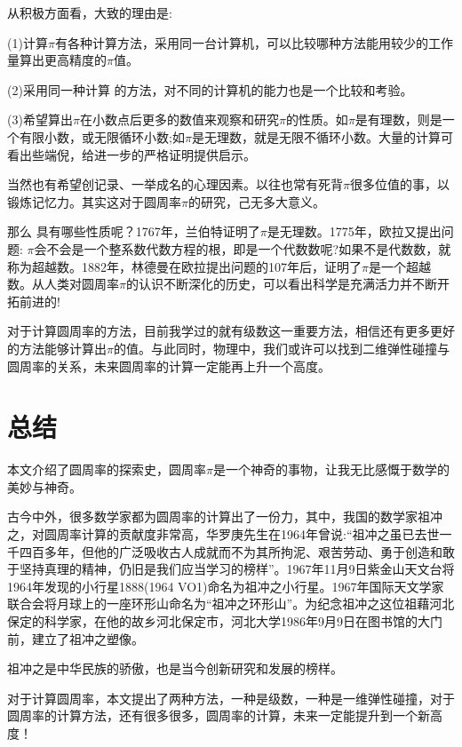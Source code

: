 \documentclass[12pt,a4paper]{ctexart}
\begin{document}
	从积极方面看，大致的理由是:
	
	(1)计算$\pi$有各种计算方法，采用同一台计算机，可以比较哪种方法能用较少的工作量算出更高精度的$\pi$值。
	
	(2)采用同一种计算 的方法，对不同的计算机的能力也是一个比较和考验。
	
	(3)希望算出$\pi$在小数点后更多的数值来观察和研究$\pi$的性质。如$\pi$是有理数，则是一个有限小数，或无限循环小数;如$\pi$是无理数，就是无限不循环小数。大量的计算可看出些端倪，给进一步的严格证明提供启示。
	
	当然也有希望创记录、一举成名的心理因素。以往也常有死背$\pi$很多位值的事，以锻炼记忆力。其实这对于圆周率$\pi$的研究，己无多大意义。
	
	那么 具有哪些性质呢？1767年，兰伯特证明了$\pi$是无理数。1775年，欧拉又提出问题: $\pi$会不会是一个整系数代数方程的根，即是一个代数数呢?如果不是代数数，就称为超越数。1882年，林德曼在欧拉提出问题的107年后，证明了$\pi$是一个超越数。从人类对圆周率$\pi$的认识不断深化的历史，可以看出科学是充满活力并不断开拓前进的\cite{RN21}!
	
	对于计算圆周率的方法，目前我学过的就有级数这一重要方法，相信还有更多更好的方法能够计算出$\pi$的值。与此同时，物理中，我们或许可以找到二维弹性碰撞与圆周率的关系，未来圆周率的计算一定能再上升一个高度。
		
	\section{总结}	
	本文介绍了圆周率的探索史，圆周率$\pi$是一个神奇的事物，让我无比感慨于数学的美妙与神奇。
	
	古今中外，很多数学家都为圆周率的计算出了一份力，其中，我国的数学家祖冲之，对圆周率计算的贡献度非常高，华罗庚先生在1964年曾说:“祖冲之虽已去世一千四百多年，但他的广泛吸收古人成就而不为其所拘泥、艰苦劳动、勇于创造和敢于坚持真理的精神，仍旧是我们应当学习的榜样”。1967年11月9日紫金山天文台将1964年发现的小行星1888(1964 VO1)命名为祖冲之小行星。1967年国际天文学家联合会将月球上的一座环形山命名为“祖冲之环形山”。为纪念祖冲之这位祖藉河北保定的科学家，在他的故乡河北保定市，河北大学1986年9月9日在图书馆的大门前，建立了祖冲之塑像。
	
	祖冲之是中华民族的骄傲，也是当今创新研究和发展的榜样。
	
	对于计算圆周率，本文提出了两种方法，一种是级数，一种是一维弹性碰撞，对于圆周率的计算方法，还有很多很多，圆周率的计算，未来一定能提升到一个新高度！
	
	
	
\end{document}

